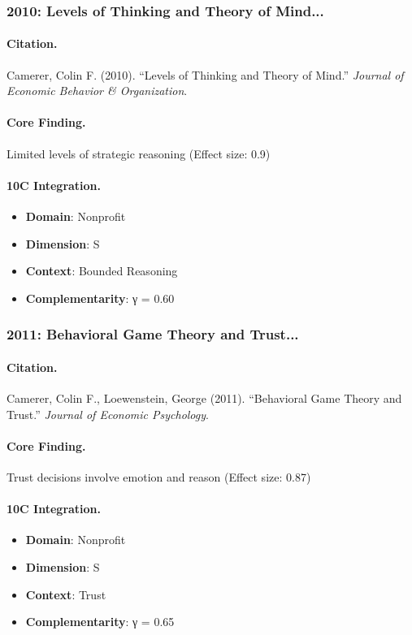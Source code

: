 \subsubsection{2010: Levels of Thinking and Theory of Mind...}

\paragraph{Citation.}
Camerer, Colin F. (2010). ``Levels of Thinking and Theory of Mind.''
\textit{Journal of Economic Behavior & Organization}.

\paragraph{Core Finding.}
Limited levels of strategic reasoning (Effect size: 0.9)

\paragraph{10C Integration.}
\begin{itemize}[nosep]
  \item \textbf{Domain}: Nonprofit
  \item \textbf{Dimension}: S
  \item \textbf{Context}: Bounded Reasoning
  \item \textbf{Complementarity}: γ = 0.60
\end{itemize}

\subsubsection{2011: Behavioral Game Theory and Trust...}

\paragraph{Citation.}
Camerer, Colin F., Loewenstein, George (2011). ``Behavioral Game Theory and Trust.''
\textit{Journal of Economic Psychology}.

\paragraph{Core Finding.}
Trust decisions involve emotion and reason (Effect size: 0.87)

\paragraph{10C Integration.}
\begin{itemize}[nosep]
  \item \textbf{Domain}: Nonprofit
  \item \textbf{Dimension}: S
  \item \textbf{Context}: Trust
  \item \textbf{Complementarity}: γ = 0.65
\end{itemize}

